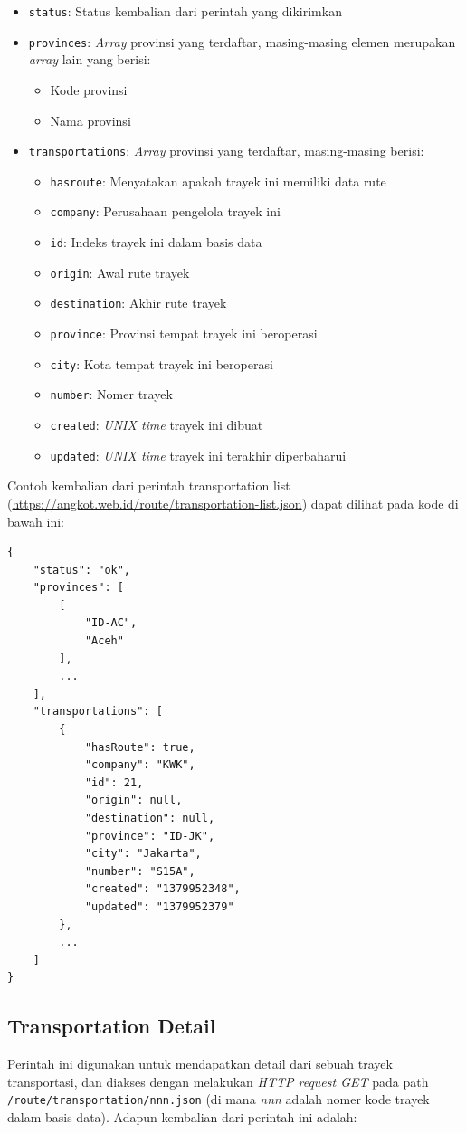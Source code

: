 \begin{itemize}
	\item \texttt{status}: Status kembalian dari perintah yang dikirimkan
	\item \texttt{provinces}: \textit{Array} provinsi yang terdaftar, masing-masing elemen merupakan \textit{array} lain yang berisi:
		\begin{itemize}
			\item Kode provinsi
			\item Nama provinsi
		\end{itemize}
	\item \texttt{transportations}: \textit{Array} provinsi yang terdaftar, masing-masing berisi:
		\begin{itemize}
			\item \texttt{hasroute}: Menyatakan apakah trayek ini memiliki data rute
			\item \texttt{company}: Perusahaan pengelola trayek ini
			\item \texttt{id}: Indeks trayek ini dalam basis data
			\item \texttt{origin}: Awal rute trayek
			\item \texttt{destination}: Akhir rute trayek
			\item \texttt{province}: Provinsi tempat trayek ini beroperasi
			\item \texttt{city}: Kota tempat trayek ini beroperasi
			\item \texttt{number}: Nomer trayek
			\item \texttt{created}: \textit{UNIX time} trayek ini dibuat
			\item \texttt{updated}: \textit{UNIX time} trayek ini terakhir diperbaharui
		\end{itemize}
\end{itemize}

Contoh kembalian dari perintah transportation list (\url{https://angkot.web.id/route/transportation-list.json}) dapat dilihat pada kode di bawah ini:

\begin{lstlisting}
{
	"status": "ok",
	"provinces": [
		[
			"ID-AC",
			"Aceh"
		],
		...
	],
	"transportations": [
		{
			"hasRoute": true,
			"company": "KWK",
			"id": 21,
			"origin": null,
			"destination": null,
			"province": "ID-JK",
			"city": "Jakarta",
			"number": "S15A",
			"created": "1379952348",
			"updated": "1379952379"
		},
		...
	]
}
\end{lstlisting}

\subsection{Transportation Detail}
Perintah ini digunakan untuk mendapatkan detail dari sebuah trayek transportasi, dan diakses dengan melakukan \textit{HTTP request GET} pada path \texttt{/route/transportation/nnn.json} (di mana \textit{nnn} adalah nomer kode trayek dalam basis data). Adapun kembalian dari perintah ini adalah:

